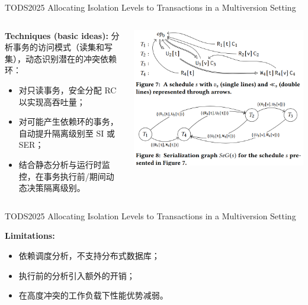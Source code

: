 \begin{frame}{TODS2025 Allocating Isolation Levels to Transactions in a Multiversion Setting}
	\begin{columns}
		\begin{column}{0.5\textwidth}
			\textbf{Techniques (basic ideas): }分析事务的访问模式（读集和写集），动态识别潜在的冲突依赖环：
			\begin{itemize}
				\item 对只读事务，安全分配 RC 以实现高吞吐量；
				\item 对可能产生依赖环的事务，自动提升隔离级别至 SI 或 SER；
				\item 结合静态分析与运行时监控，在事务执行前/期间动态决策隔离级别。
			\end{itemize}
		\end{column}
		\begin{column}{0.5\textwidth}
			\includegraphics[width=0.98\linewidth]{figs/confliction-detect}
		\end{column}
	\end{columns}
\end{frame}

\begin{frame}{TODS2025 Allocating Isolation Levels to Transactions in a Multiversion Setting}

	\textbf{Limitations: }
	\begin{itemize}
		\item 依赖调度分析，不支持分布式数据库；
		\item 执行前的分析引入额外的开销；
		\item 在高度冲突的工作负载下性能优势减弱。
	\end{itemize}

\end{frame}

